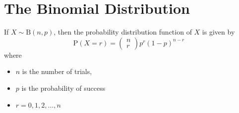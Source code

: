 \documentclass[11pt,a4paper]{book}
\begin{document}
\section{The Binomial Distribution}


\begin{tcolorbox}[colback=blue!5, colframe=black, boxrule=.4pt, sharpish corners]

If $X\sim\text{B}\left(n,p\right)$, then the probability distribution
function of $X$ is given by
\[
\text{P}\left(X=r\right)=\begin{pmatrix}n\\
r
\end{pmatrix}p^{r}\left(1-p\right)^{n-r}
\]
where

\begin{itemize}

\item  $n$ is the number of trials,

\item  $p$ is the probability of success

\item  $r=0,1,2,\ldots,n$

\end{itemize}
\end{tcolorbox}
\end{document}
